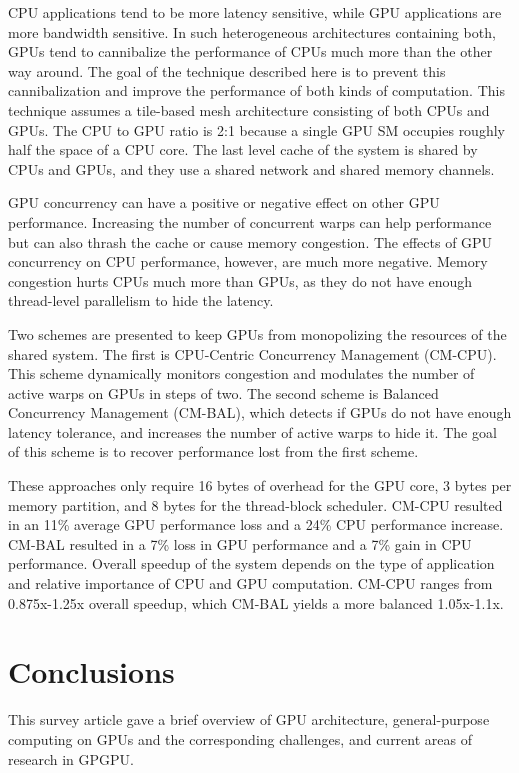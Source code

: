 \documentclass[prodmode,acmtecs]{acmsmall} %
\begin{document}
CPU applications tend to be more latency sensitive, while GPU applications are
more bandwidth sensitive. In such heterogeneous architectures containing both,
GPUs tend to cannibalize the performance of CPUs much more than the other way
around. The goal of the technique described here is to prevent this
cannibalization and improve the performance of both kinds of computation. This
technique assumes a tile-based mesh architecture consisting of both CPUs and
GPUs. The CPU to GPU ratio is 2:1 because a single GPU SM occupies roughly half
the space of a CPU core. The last level cache of the system is shared by CPUs
and GPUs, and they use a shared network and shared memory channels.

GPU concurrency can have a positive or negative effect on other GPU performance.
Increasing the number of concurrent warps can help performance but can also
thrash the cache or cause memory congestion. The effects of GPU concurrency on
CPU performance, however, are much more negative. Memory congestion hurts CPUs
much more than GPUs, as they do not have enough thread-level parallelism to hide
the latency.

Two schemes are presented to keep GPUs from monopolizing the resources of the
shared system. The first is CPU-Centric Concurrency Management (CM-CPU). This
scheme dynamically monitors congestion and modulates the number of active warps
on GPUs in steps of two. The second scheme is Balanced Concurrency Management
(CM-BAL), which detects if GPUs do not have enough latency tolerance, and
increases the number of active warps to hide it. The goal of this scheme is to
recover performance lost from the first scheme.

These approaches only require 16 bytes of overhead for the GPU core, 3 bytes per
memory partition, and 8 bytes for the thread-block scheduler. CM-CPU resulted in
an 11\% average GPU performance loss and a 24\% CPU performance increase. CM-BAL
resulted in a 7\% loss in GPU performance and a 7\% gain in CPU performance.
Overall speedup of the system depends on the type of application and relative
importance of CPU and GPU computation. CM-CPU ranges from 0.875x-1.25x overall
speedup, which CM-BAL yields a more balanced 1.05x-1.1x.

\section{Conclusions} \label{sec:conclusions}
This survey article gave a brief overview of GPU architecture, general-purpose
computing on GPUs and the corresponding challenges, and current areas of
research in GPGPU.
\end{document}

